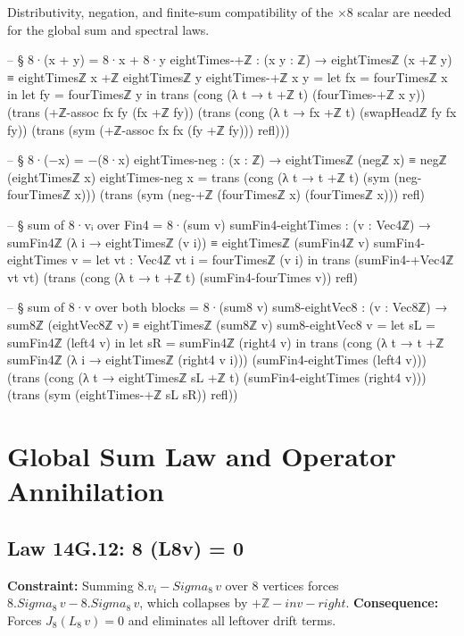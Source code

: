 \documentclass[11pt,a4paper]{book}
\def\Sigma{Sigma}%
\def\cdot{.}%
\def\texttt#1{#1}%
\def\texorpdfstring#1#2{#2}%
\begin{document}
Distributivity, negation, and finite-sum compatibility of the $\times 8$
scalar are needed for the global sum and spectral laws.

\begin{code}
-- § 8·(x + y) = 8·x + 8·y
eightTimes-+ℤ : (x y : ℤ) → eightTimesℤ (x +ℤ y) ≡ eightTimesℤ x +ℤ eightTimesℤ y
eightTimes-+ℤ x y =
  let fx = fourTimesℤ x in
  let fy = fourTimesℤ y in
  trans
    (cong (λ t → t +ℤ t) (fourTimes-+ℤ x y))
    (trans
      (+ℤ-assoc fx fy (fx +ℤ fy))
      (trans
        (cong (λ t → fx +ℤ t) (swapHeadℤ fy fx fy))
        (trans
          (sym (+ℤ-assoc fx fx (fy +ℤ fy)))
          refl)))

-- § 8·(−x) = −(8·x)
eightTimes-neg : (x : ℤ) → eightTimesℤ (negℤ x) ≡ negℤ (eightTimesℤ x)
eightTimes-neg x =
  trans
    (cong (λ t → t +ℤ t) (sym (neg-fourTimesℤ x)))
    (trans
      (sym (neg-+ℤ (fourTimesℤ x) (fourTimesℤ x)))
      refl)

-- § sum of 8·vᵢ over Fin4 = 8·(sum v)
sumFin4-eightTimes : (v : Vec4ℤ) →
  sumFin4ℤ (λ i → eightTimesℤ (v i)) ≡ eightTimesℤ (sumFin4ℤ v)
sumFin4-eightTimes v =
  let vt : Vec4ℤ
      vt i = fourTimesℤ (v i)
  in
  trans
    (sumFin4-+Vec4ℤ vt vt)
    (trans
      (cong (λ t → t +ℤ t) (sumFin4-fourTimes v))
      refl)

-- § sum of 8·v over both blocks = 8·(sum8 v)
sum8-eightVec8 : (v : Vec8ℤ) → sum8ℤ (eightVec8ℤ v) ≡ eightTimesℤ (sum8ℤ v)
sum8-eightVec8 v =
  let sL = sumFin4ℤ (left4 v) in
  let sR = sumFin4ℤ (right4 v) in
  trans
    (cong
      (λ t → t +ℤ sumFin4ℤ (λ i → eightTimesℤ (right4 v i)))
      (sumFin4-eightTimes (left4 v)))
    (trans
      (cong
        (λ t → eightTimesℤ sL +ℤ t)
        (sumFin4-eightTimes (right4 v)))
      (trans
        (sym (eightTimes-+ℤ sL sR))
        refl))
\end{code}

\section{Global Sum Law and Operator Annihilation}

\subsection{Law 14G.12: \texorpdfstring{$\Sigma_8 (L_8\,v) = 0$}{8 (L8v) = 0}}

\textbf{Constraint:} Summing $8 \cdot v_i - \Sigma_8\,v$ over 8 vertices forces
$8 \cdot \Sigma_8\,v - 8 \cdot \Sigma_8\,v$, which collapses by $\texttt{+ℤ-inv-right}$.
\textbf{Consequence:} Forces $J_8 (L_8\,v) = 0$ and eliminates all leftover drift terms.
\end{document}
